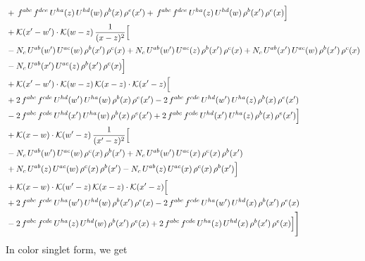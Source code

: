 \documentclass[9pt]{article}
\numberwithin{equation}{section}
\begin{document}
\begin{align}
& +\,f^{abc}\,f^{dce}\,U^{ha}(z)\,U^{hd}(w)\,\rho^{b}(x)\,\rho^{e}(x') +\,f^{abc}\,f^{dce}\,U^{ha}(z)\,U^{hd}(w)\,\rho^{b}(x')\,\rho^{e}(x)\Big]\notag\\
& +\mathcal{K}(x'-w')\cdot\mathcal{K}(w-z)\,\frac{1}{(x-z)^{2}}\Big[\notag\\
& -N_{c}\,U^{ab}(w')\,U^{ac}(w)\,\rho^{b}(x')\,\rho^{c}(x) +N_{c}\,U^{ab}(w')\,U^{ac}(z)\,\rho^{b}(x')\,\rho^{c}(x) +N_{c}\,U^{ab}(x')\,U^{ac}(w)\,\rho^{b}(x')\,\rho^{c}(x)\notag\\
& -N_{c}\,U^{ab}(x')\,U^{ac}(z)\,\rho^{b}(x')\,\rho^{c}(x)\Big]\notag\\
& +\mathcal{K}(x'-w')\cdot\mathcal{K}(w-z)\,\mathcal{K}(x-z)\cdot\mathcal{K}(x'-z)\Big[\notag\\
& +2\,f^{abc}\,f^{cde}\,U^{hd}(w')\,U^{ha}(w)\,\rho^{b}(x)\,\rho^{e}(x') -2\,f^{abc}\,f^{cde}\,U^{hd}(w')\,U^{ha}(z)\,\rho^{b}(x)\,\rho^{e}(x')\notag\\
& -2\,f^{abc}\,f^{cde}\,U^{hd}(x')\,U^{ha}(w)\,\rho^{b}(x)\,\rho^{e}(x') +2\,f^{abc}\,f^{cde}\,U^{hd}(x')\,U^{ha}(z)\,\rho^{b}(x)\,\rho^{e}(x')\Big]\notag\\
& +\mathcal{K}(x-w)\cdot\mathcal{K}(w'-z)\,\frac{1}{(x'-z)^{2}}\Big[\notag\\
& -N_{c}\,U^{ab}(w')\,U^{ac}(w)\,\rho^{c}(x)\,\rho^{b}(x') +N_{c}\,U^{ab}(w')\,U^{ac}(x)\,\rho^{c}(x)\,\rho^{b}(x')\notag\\
& +N_{c}\,U^{ab}(z)\,U^{ac}(w)\,\rho^{c}(x)\,\rho^{b}(x') -N_{c}\,U^{ab}(z)\,U^{ac}(x)\,\rho^{c}(x)\,\rho^{b}(x')\Big]\notag\\
& +\mathcal{K}(x-w)\cdot\mathcal{K}(w'-z)\,\mathcal{K}(x-z)\cdot\mathcal{K}(x'-z)\Big[\notag\\
& +2\,f^{abc}\,f^{cde}\,U^{ha}(w')\,U^{hd}(w)\,\rho^{b}(x')\,\rho^{e}(x) -2\,f^{abc}\,f^{cde}\,U^{ha}(w')\,U^{hd}(x)\,\rho^{b}(x')\,\rho^{e}(x)\notag\\
& -2\,f^{abc}\,f^{cde}\,U^{ha}(z)\,U^{hd}(w)\,\rho^{b}(x')\,\rho^{e}(x) +2\,f^{abc}\,f^{cde}\,U^{ha}(z)\,U^{hd}(x)\,\rho^{b}(x')\,\rho^{e}(x)\Big]\Bigg]
\end{align}
In color singlet form, we get
\end{document}
